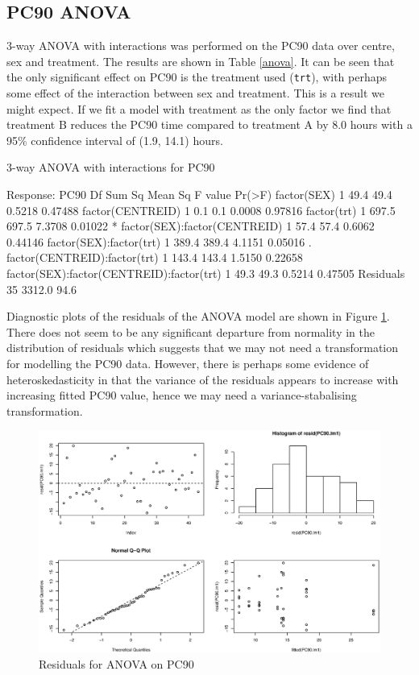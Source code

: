 \subsection{PC90 ANOVA} 
3-way ANOVA with interactions was performed on the PC90 data over centre, sex and treatment. The results are shown in Table \ref{anova}. It can be seen that the only significant effect on PC90 is the treatment used (\texttt{trt}), with perhaps some effect of the interaction between sex and treatment. This is a result we might expect. If we fit a model with treatment as the only factor we find that treatment B reduces the PC90 time compared to treatment A by 8.0 hours with a 95\% confidence interval of (1.9, 14.1) hours.
\begin{table}[h]
\centering
\caption{3-way ANOVA with interactions for PC90}\label{anova}
\begin{boxedverbatim}
Response: PC90
                                         Df Sum Sq Mean Sq F value  Pr(>F)  
factor(SEX)                               1   49.4    49.4  0.5218 0.47488  
factor(CENTREID)                          1    0.1     0.1  0.0008 0.97816  
factor(trt)                               1  697.5   697.5  7.3708 0.01022 *
factor(SEX):factor(CENTREID)              1   57.4    57.4  0.6062 0.44146  
factor(SEX):factor(trt)                   1  389.4   389.4  4.1151 0.05016 .
factor(CENTREID):factor(trt)              1  143.4   143.4  1.5150 0.22658  
factor(SEX):factor(CENTREID):factor(trt)  1   49.3    49.3  0.5214 0.47505  
Residuals                                35 3312.0    94.6
\end{boxedverbatim}
\end{table}

Diagnostic plots of the residuals of the ANOVA model are shown in Figure \ref{resid}. There does not seem to be any significant departure from normality in the distribution of residuals which suggests that we may not need a transformation for modelling the PC90 data. However, there is perhaps some evidence of heteroskedasticity in that the variance of the residuals appears to increase with increasing fitted PC90 value, hence we may need a variance-stabalising transformation.
\begin{figure}
\centering
\includegraphics[scale=0.8]{PC90diag.eps}
\caption{Residuals for ANOVA on PC90}\label{resid}
\end{figure}

